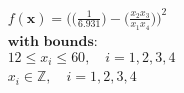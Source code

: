 \begin{equation*}
\begin{aligned}
& f(\bm{x}) = \Big(\Big(\frac{1}{6.931}\Big) - \Big(\frac{x_2 x_3}{x_1 x_4} \Big)  \Big)^2 \\[0.5em]
& \textbf{with bounds:} \\
& 12 \leq x_i \leq 60, \quad i = 1, 2, 3, 4 \\
& x_i \in \mathbb{Z}, \quad i = 1, 2, 3, 4
\end{aligned}
\end{equation*}